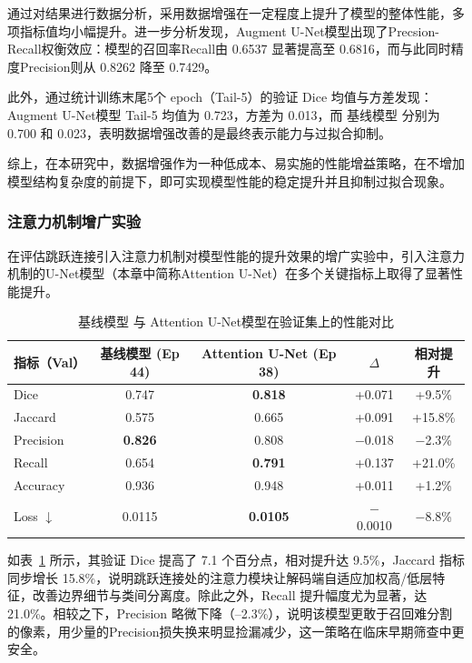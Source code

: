 通过对结果进行数据分析，采用数据增强在一定程度上提升了模型的整体性能，多项指标值均小幅提升。进一步分析发现，Augment U-Net模型出现了Precsion-Recall权衡效应：模型的召回率Recall由 0.6537 显著提高至 0.6816，而与此同时精度Precision则从 0.8262 降至 0.7429。

此外，通过统计训练末尾5个 epoch（Tail-5）的验证 Dice 均值与方差发现：Augment U-Net模型 Tail-5 均值为 0.723，方差为 0.013，而 基线模型 分别为 0.700 和 0.023，表明数据增强改善的是最终表示能力与过拟合抑制。

综上，在本研究中，数据增强作为一种低成本、易实施的性能增益策略，在不增加模型结构复杂度的前提下，即可实现模型性能的稳定提升并且抑制过拟合现象。

\subsubsection{注意力机制增广实验}

在评估跳跃连接引入注意力机制对模型性能的提升效果的增广实验中，引入注意力机制的U-Net模型（本章中简称Attention U-Net）在多个关键指标上取得了显著性能提升。

\begin{table}[htbp]
    \centering
    \caption{基线模型 与 Attention U-Net模型在验证集上的性能对比}
    \label{tab:att_unet}
    \begin{tabular}{lcccc}
        \toprule
        指标（Val） & 基线模型 (Ep 44) & Attention U-Net (Ep 38) &  $\Delta$ & 相对提升 \\
        \midrule
        Dice        & 0.747 & \textbf{0.818} & +0.071 & +9.5\% \\
        Jaccard     & 0.575 & 0.665 & +0.091 & +15.8\% \\
        Precision   & \textbf{0.826} & 0.808 & $-$0.018 & $-$2.3\% \\
        Recall      & 0.654 & \textbf{0.791} & +0.137 & +21.0\% \\
        Accuracy    & 0.936 & 0.948 & +0.011 & +1.2\% \\
        Loss $\downarrow$ & 0.0115 & \textbf{0.0105} & $-$0.0010 & $-$8.8\% \\
        \bottomrule
    \end{tabular}
\end{table}

如表~\ref{tab:att_unet} 所示，其验证 Dice 提高了 7.1 个百分点，相对提升达 9.5\%，Jaccard 指标同步增长 15.8\%，说明跳跃连接处的注意力模块让解码端自适应加权高/低层特征，改善边界细节与类间分离度。除此之外，Recall 提升幅度尤为显著，达 21.0\%。相较之下，Precision 略微下降（–2.3\%），说明该模型更敢于召回难分割的像素，用少量的Precision损失换来明显捡漏减少，这一策略在临床早期筛查中更安全。

